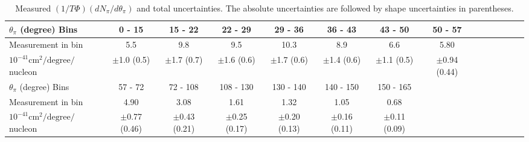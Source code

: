 \clearpage
\begingroup
\squeezetable
\begin{table}[h]
\begin{tabular}{l|ccccccccccccc}
\hline\hline
$\theta_{\pi}$ (degree) Bins & 0 - 15 & 15 - 22 & 22 - 29 & 29 - 36 & 36 - 43 & 43 - 50 & 50 - 57 \\ 
\hline
Measurement in bin & 5.5 & 9.8 & 9.5 & 10.3 & 8.9 & 6.6 & 5.80 \\ 
$10^{-41}\mathrm{cm}^2/\mathrm{degree}/$nucleon &  $\pm$1.0 (0.5) &  $\pm$1.7 (0.7) &  $\pm$1.6 (0.6) &  $\pm$1.7 (0.6) &  $\pm$1.4 (0.6) &  $\pm$1.1 (0.5) &  $\pm$0.94 (0.44) \\ 
\hline
$\theta_{\pi}$ (degree) Bins & 57 - 72 & 72 - 108 & 108 - 130 & 130 - 140 & 140 - 150 & 150 - 165 \\ 
\hline
Measurement in bin & 4.90 & 3.08 & 1.61 & 1.32 & 1.05 & 0.68 \\ 
$10^{-41}\mathrm{cm}^2/\mathrm{degree}/$nucleon & $\pm$0.77 (0.46) &  $\pm$0.43 (0.21) &  $\pm$0.25 (0.17) &  $\pm$0.20 (0.13) &  $\pm$0.16 (0.11) &  $\pm$0.11 (0.09) \\ 
\hline\hline
\end{tabular}
\caption{Measured \ccpi $(1/T\Phi)(dN_{\pi} / d\theta_\pi)$ and total uncertainties.  The absolute uncertainties are followed by shape uncertainties in parentheses.}
\end{table}
\endgroup

